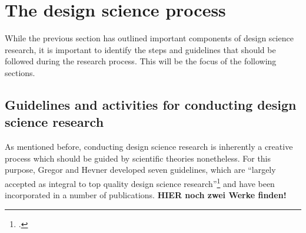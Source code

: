 \section{The design science process}
While the previous section has outlined important components of design science research, it is important to identify the steps and guidelines that should be followed during the research process. This will be the focus of the following sections.

\subsection{Guidelines and activities for conducting design science research} \label{subsec:GuidelinesDesignScience}
As mentioned before, conducting design science research is inherently a creative process which should be guided by scientific theories nonetheless. For this purpose, Gregor and Hevner developed seven guidelines, which are \enquote{largely accepted as integral to top quality design science research}\footcite[p.19]{HevnerDesignResearchInformation2010} and have been incorporated in a number of publications. \textbf{HIER noch zwei Werke finden!}

